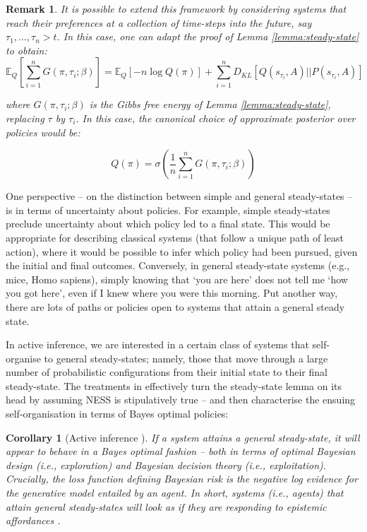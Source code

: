\documentclass{article}
\newcommand{\E}{\mathbb E}
\newtheorem{corollary}[theorem]{Corollary}
\newtheorem{remark}[theorem]{Remark}
\begin{document}
\begin{remark}
It is possible to extend this framework by considering systems that reach their preferences at a collection of time-steps into the future, say $\tau_1,...,\tau_n >t$. In this case, one can adapt the proof of Lemma \ref{lemma:steady-state} to obtain:
\begin{equation}
    \E_Q \left[\sum_{i =1}^n G(\pi, \tau_i; \beta)\right ]= \E_Q[-n \log Q(\pi)]+ \sum_{i =1}^n D_{KL}[Q(s_{\tau_i},A)||P(s_{\tau_i}, A)]
\end{equation}

where $G(\pi, \tau_i; \beta)$ is the Gibbs free energy of Lemma \ref{lemma:steady-state}, replacing $\tau$ by $\tau_i$. In this case, the canonical choice of approximate posterior over policies would be:

\begin{equation}
    Q(\pi)= \sigma \left(\frac 1 n \sum_{i =1}^n G(\pi, \tau_i; \beta)\right)
\end{equation}

\end{remark}

One perspective – on the distinction between simple and general steady-states – is in terms of uncertainty about policies. For example, simple steady-states preclude uncertainty about which policy led to a final state. This would be appropriate for describing classical systems (that follow a unique path of least action), where it would be possible to infer which policy had been pursued, given the initial and final outcomes. Conversely, in general steady-state systems (e.g., mice, Homo sapiens), simply knowing that ‘you are here’ does not tell me ‘how you got here’, even if I knew where you were this morning. Put another way, there are lots of paths or policies open to systems that attain a general steady state.

In active inference, we are interested in a certain class of systems that self-organise to general steady-states; namely, those that move through a large number of probabilistic configurations from their initial state to their final steady-state. The treatments in \cite{parrMarkovBlanketsInformation2019,fristonFreeEnergyPrinciple2019} effectively turn the steady-state lemma on its head by assuming NESS is stipulatively true – and then characterise the ensuing self-organisation in terms of Bayes optimal policies:

\begin{corollary}[Active inference \cite{fristonFreeEnergyPrinciple2019}]
If a system attains a general steady-state, it will appear to behave in a Bayes optimal fashion – both in terms of optimal Bayesian design (i.e., exploration) and Bayesian decision theory (i.e., exploitation). Crucially, the loss function defining Bayesian risk is the negative log evidence for the generative model entailed by an agent. In short, systems (i.e., agents) that attain general steady-states will look as if they are responding to epistemic affordances \cite{parrWorkingMemoryAttention2017}.
\end{corollary}
\end{document}
